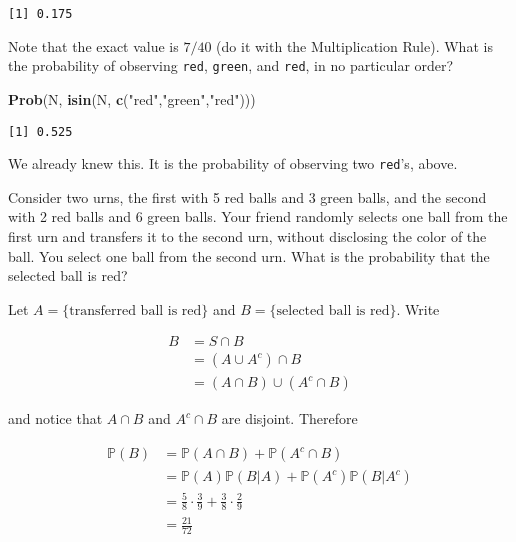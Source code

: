 \documentclass[]{book}
\newenvironment{Shaded}{\begin{snugshade}}{\end{snugshade}}
\newcommand{\KeywordTok}[1]{\textcolor[rgb]{0.13,0.29,0.53}{\textbf{{#1}}}}
\newcommand{\StringTok}[1]{\textcolor[rgb]{0.31,0.60,0.02}{{#1}}}
\newcommand{\NormalTok}[1]{{#1}}
\numberwithin{equation}{chapter}
\numberwithin{figure}{chapter}
\theoremstyle{plain}
\theoremstyle{definition}
\theoremstyle{remark}
\theoremstyle{definition}
\theoremstyle{definition}
\theoremstyle{remark}
\let\BeginKnitrBlock\begin \let\EndKnitrBlock\end
\begin{document}
\begin{verbatim}
[1] 0.175
\end{verbatim}

Note that the exact value is \(7/40\) (do it with the Multiplication
Rule). What is the probability of observing \texttt{red},
\texttt{green}, and \texttt{red}, in no particular order?

\begin{Shaded}
\begin{Highlighting}[]
\KeywordTok{Prob}\NormalTok{(N, }\KeywordTok{isin}\NormalTok{(N, }\KeywordTok{c}\NormalTok{(}\StringTok{"red"}\NormalTok{,}\StringTok{"green"}\NormalTok{,}\StringTok{"red"}\NormalTok{)))}
\end{Highlighting}
\end{Shaded}

\begin{verbatim}
[1] 0.525
\end{verbatim}

We already knew this. It is the probability of observing two
\texttt{red}'s, above.

\bigskip

\BeginKnitrBlock{example}
\protect\hypertarget{ex:unnamed-chunk-165}{}{\label{ex:unnamed-chunk-165}}Consider
two urns, the first with 5 red balls and 3 green balls, and the second
with 2 red balls and 6 green balls. Your friend randomly selects one
ball from the first urn and transfers it to the second urn, without
disclosing the color of the ball. You select one ball from the second
urn. What is the probability that the selected ball is red?
\EndKnitrBlock{example}

Let \(A = \{ \mbox{transferred ball is red} \}\) and
\(B = \{ \mbox{selected ball is red} \}\). Write

\begin{align*}
B & =S\cap B\\
 & =(A\cup A^{c})\cap B\\
 & =(A\cap B)\cup(A^{c}\cap B)
\end{align*}

and notice that \(A\cap B\) and \(A^{c}\cap B\) are disjoint. Therefore

\begin{align*}
\mathbb{P}(B) & =\mathbb{P}(A\cap B)+\mathbb{P}(A^{c}\cap B)\\
 & =\mathbb{P}(A)\mathbb{P}(B|A)+\mathbb{P}(A^{c})\mathbb{P}(B|A^{c})\\
 & =\frac{5}{8}\cdot\frac{3}{9}+\frac{3}{8}\cdot\frac{2}{9}\\
 & =\frac{21}{72}\ 
\end{align*}
\end{document}
